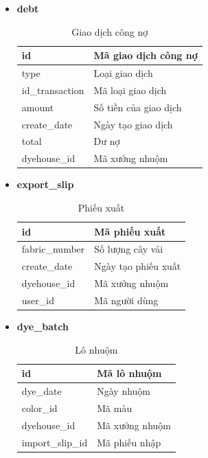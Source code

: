 \begin{itemize}
    \item \textbf{debt}
    \begin{table}[H]
        \centering
        \begin{tabular}{|m{3cm}|m{10cm}|}
        \hline 
            id & Mã giao dịch công nợ\\ \hline
            type & Loại giao dịch \\ \hline
            id\_transaction & Mã loại giao dịch\\ \hline
            amount & Số tiền của giao dịch\\ \hline
            create\_date & Ngày tạo giao dịch \\ \hline
            total & Dư nợ\\ \hline
            dyehouse\_id & Mã xưởng nhuộm\\
        \hline 
        \end{tabular}
        \caption{Giao dịch công nợ}
        \label{debt}
    \end{table}
    
    \item \textbf{export\_slip}
    \begin{table}[H]
        \centering
        \begin{tabular}{|m{3cm}|m{10cm}|}
        \hline 
            id & Mã phiếu xuất\\ \hline
            fabric\_number & Số lượng cây vải\\ \hline
            create\_date & Ngày tạo phiếu xuất \\ \hline
            dyehouse\_id & Mã xưởng nhuộm\\ \hline
            user\_id & Mã người dùng\\ 
        \hline 
        \end{tabular}
        \caption{Phiếu xuất}
        \label{export_slip}
    \end{table}
    
    \item \textbf{dye\_batch}
    \begin{table}[H]
        \centering
        \begin{tabular}{|m{3cm}|m{10cm}|}
        \hline 
            id & Mã lô nhuộm\\ \hline
            dye\_date & Ngày nhuộm\\ \hline
            color\_id & Mã màu \\ \hline
            dyehouse\_id & Mã xưởng nhuộm\\ \hline
            import\_slip\_id & Mã phiếu nhập\\ 
        \hline 
        \end{tabular}
        \caption{Lô nhuộm}
        \label{dye_batch}
    \end{table}
    

\end{itemize}

